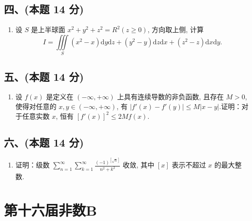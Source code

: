 \subsection*{四、(本题 14 分)}
\begin{enumerate}[start=8]
    \item 设 $S$ 是上半球面 $x^2 + y^2 + z^2 = R^2 (z \geqslant 0)$, 方向取上侧, 计算
          \[
              I = \iiint\limits_{S} (x^2 - x) \mathrm{d}y \mathrm{d}z + (y^2 - y) \mathrm{d}z \mathrm{d}x + (z^2 - z) \mathrm{d}x \mathrm{d}y.
          \]
\end{enumerate}

\subsection*{五、(本题 14 分)}
\begin{enumerate}[start=9]
    \item 设 $f(x)$ 是定义在 $(-\infty, +\infty)$ 上具有连续导数的非负函数, 且存在 $M > 0$, 使得对任意的 $x, y \in (-\infty, +\infty)$, 有 $|f'(x) - f'(y)| \leqslant M |x - y|$.证明：对于任意实数 $x$, 恒有 $[f'(x)]^2 \leqslant 2Mf(x)$.
\end{enumerate}

\subsection*{六、(本题 14 分)}
\begin{enumerate}[start=10]
    \item 证明：级数 $\displaystyle\sum_{n=1}^{\infty} \sum_{k=1}^{\infty} \frac{(-1)^{[\sqrt{n}]}}{n^2 + k^2}$ 收敛, 其中 $[x]$ 表示不超过 $x$ 的最大整数.
\end{enumerate}


\newpage
\section{第十六届非数B}

